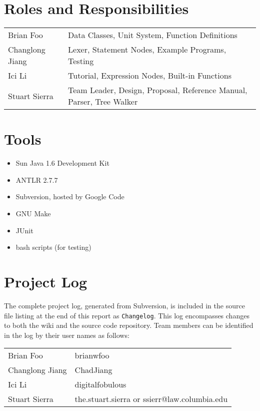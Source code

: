 \section{Roles and Responsibilities}

\begin{tabular}{ll}
Brian Foo       & Data Classes, Unit System, Function Definitions \\
Changlong Jiang & Lexer, Statement Nodes, Example Programs, Testing \\
Ici Li          & Tutorial, Expression Nodes, Built-in Functions \\
Stuart Sierra   & Team Leader, Design, Proposal, Reference Manual, Parser, Tree Walker
\end{tabular}



\section{Tools}

\begin{itemize}
\item Sun Java 1.6 Development Kit
\item ANTLR 2.7.7
\item Subversion, hosted by Google Code
\item GNU Make
\item JUnit
\item bash scripts (for testing)
\end{itemize}


\section{Project Log}

The complete project log, generated from Subversion, is included in
the source file listing at the end of this report as
\texttt{Changelog}.  This log encompasses changes to both the wiki and
the source code repository.  Team members can be identified in the log
by their user names as follows:

\vspace{1em}
\begin{tabular}{ll}
Brian Foo       & brianwfoo \\
Changlong Jiang & ChadJiang \\
Ici Li          & digitalfobulous \\
Stuart Sierra   & the.stuart.sierra or ssierr@law.columbia.edu \\
\end{tabular}
